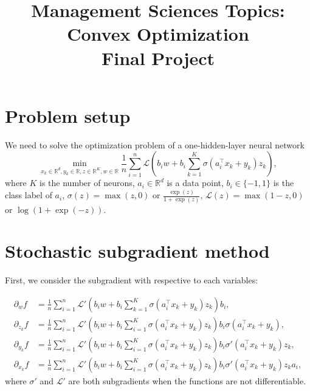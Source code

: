 \documentclass{article}
\numberwithin{equation}{section}
\numberwithin{figure}{section}
\begin{document}
\title{Management Sciences Topics: Convex Optimization\\ Final Project}
\date{}
\maketitle

\section{Problem setup}

We need to solve the optimization problem of a one-hidden-layer neural network
\begin{equation}
\min_{x_k\in\mathbb{R}^d, y_k\in\mathbb{R}, z\in\mathbb{R}^K, w\in\mathbb{R}} \frac{1}{n}\sum_{i=1}^{n}\mathcal{L}\left(b_iw+b_i\sum_{k=1}^K \sigma(a_i^\top x_k + y_k)z_k\right),
\end{equation}
where $K$ is the number of neurons, $a_i\in\mathbb{R}^d $ is a data point, $b_i\in\{-1, 1\} $ is the class label of $a_i $, $\sigma(z) = \max(z, 0) $ or $\frac{\exp(z)}{1+\exp(z)}$, $\mathcal{L}(z) = \max(1-z, 0)$ or $\log(1+\exp(-z))$.

\section{Stochastic subgradient method}

First, we consider the subgradient with respective to each variables:

\begin{equation}
\begin{aligned}
\partial_w f &= \frac{1}{n}\sum_{i=1}^n\mathcal{L}'\left(b_iw+b_i\sum_{k=1}^K \sigma(a_i^\top x_k + y_k)z_k\right) b_i, \\
\partial_{z_k} f &= \frac{1}{n}\sum_{i=1}^n\mathcal{L}'\left(b_iw+b_i\sum_{i=1}^{K}\sigma(a_i^\top x_k + y_k)z_k\right) b_i\sigma(a_i^\top x_k+y_k), \\
\partial_{y_k} f &= \frac{1}{n}\sum_{i=1}^{n}\mathcal{L}'\left(b_iw+b_i\sum_{i=1}^{K}\sigma(a_i^\top x_k + y_k)z_k\right)b_i\sigma'(a_i^\top x_k + y_k)z_k, \\
\partial_{x_k} f &= \frac{1}{n}\sum_{i=1}^{n}\mathcal{L}'\left(b_iw+b_i\sum_{i=1}^{K}\sigma(a_i^\top x_k + y_k)z_k\right)b_i\sigma'(a_i^\top x_k+y_k)z_ka_i,
\end{aligned}
\end{equation}
where $\sigma'$ and $\mathcal{L}'$ are both subgradients when the functions are not differentiable.
\end{document}
